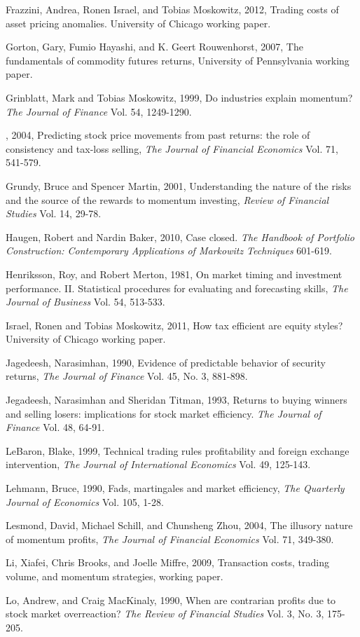 \documentclass[12pt]{article}
\begin{document}
\begin{thebibliography}{100}
 Frazzini, Andrea, Ronen Israel, and Tobias Moskowitz, 2012, Trading costs of asset pricing anomalies. University of Chicago working paper.

 Gorton, Gary, Fumio Hayashi, and K. Geert Rouwenhorst, 2007, The fundamentals of commodity futures returns, University of Pennsylvania working paper.

 Grinblatt, Mark and Tobias Moskowitz, 1999, Do industries explain momentum? \emph{The Journal of Finance} Vol. 54, 1249-1290.

 \underline{\hspace{1cm}}, 2004, Predicting stock price movements from past returns: the role of consistency and tax-loss selling, \emph{The Journal of Financial Economics} Vol. 71, 541-579.

 Grundy, Bruce and Spencer Martin, 2001, Understanding the nature of the risks and the source of the rewards to momentum investing, \emph{Review of Financial Studies} Vol. 14, 29-78.

 Haugen, Robert and Nardin Baker, 2010, Case closed. \emph{The Handbook of Portfolio Construction: Contemporary Applications of Markowitz Techniques} 601-619.

 Henriksson, Roy, and Robert Merton, 1981, On market timing and investment performance. II. Statistical procedures for evaluating and forecasting skills, \emph{The Journal of Business} Vol. 54, 513-533.

 Israel, Ronen and Tobias Moskowitz, 2011, How tax efficient are equity styles? University of Chicago working paper.

 Jagedeesh, Narasimhan, 1990, Evidence of predictable behavior of security returns, \emph{The Journal of Finance} Vol. 45, No. 3, 881-898.

 Jegadeesh, Narasimhan and Sheridan Titman, 1993, Returns to buying winners and selling losers: implications for stock market efficiency. \emph{The Journal of Finance} Vol. 48, 64-91.

 LeBaron, Blake, 1999, Technical trading rules profitability and foreign exchange intervention, \emph{The Journal of International Economics} Vol. 49, 125-143.

 Lehmann, Bruce, 1990, Fads, martingales and market efficiency, \emph{The Quarterly Journal of Economics} Vol. 105, 1-28.

 Lesmond, David, Michael Schill, and Chunsheng Zhou, 2004, The illusory nature of momentum profits, \emph{The Journal of Financial Economics} Vol. 71, 349-380.

 Li, Xiafei, Chris Brooks, and Joelle Miffre, 2009, Transaction costs, trading volume, and momentum strategies, working paper.

 Lo, Andrew, and Craig MacKinaly, 1990, When are contrarian profits due to stock market overreaction? \emph{The Review of Financial Studies} Vol. 3, No. 3, 175-205.

\end{thebibliography}
\end{document}

